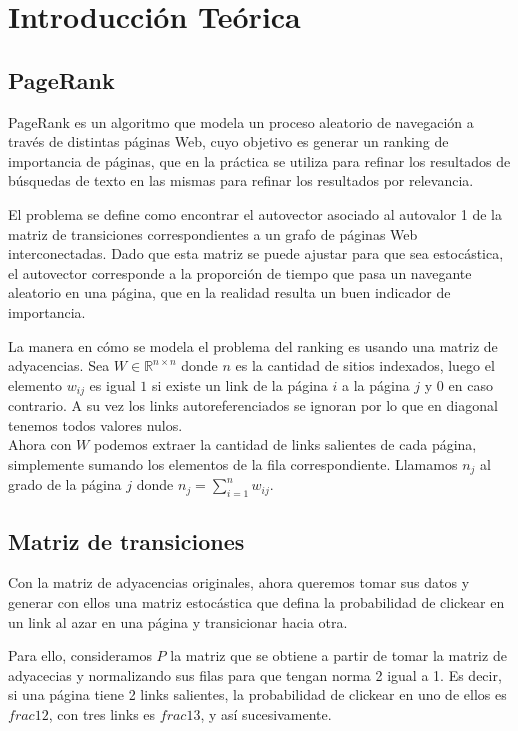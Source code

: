 \section{Introducción Teórica}

\subsection{PageRank}

PageRank es un algoritmo que modela un proceso aleatorio de navegación a través de 
distintas páginas Web, cuyo objetivo es generar un ranking de importancia de páginas,
que en la práctica se utiliza para refinar los resultados de búsquedas de texto en las mismas
para refinar los resultados por relevancia.

El problema se define como encontrar el autovector asociado al autovalor 1 de la matriz de transiciones
correspondientes a un grafo de páginas Web interconectadas. Dado que esta matriz se puede ajustar
para que sea estocástica, el autovector corresponde a la proporción de tiempo que pasa un navegante
aleatorio en una página, que en la realidad resulta un buen indicador de importancia.

La manera en cómo se modela el problema del ranking es usando una matriz de adyacencias.
Sea $W \in \mathbb{R}^{n \times n}$ donde $n$ es la cantidad de sitios indexados, luego el elemento
$w_{ij}$ es igual $1$ si existe un link de la página $i$ a la página $j$ y $0$ en caso
contrario. A su vez los links autoreferenciados se ignoran por lo que en diagonal tenemos todos valores nulos.\\

Ahora con $W$ podemos extraer la cantidad de links salientes de cada página,
simplemente sumando los elementos de la fila correspondiente. Llamamos $n_j$
al grado de la página $j$ donde $n_j = \sum^{n}_{i = 1} w_{ij}$.

\subsection{Matriz de transiciones}

Con la matriz de adyacencias originales, ahora queremos tomar sus datos y generar con ellos
una matriz estocástica que defina la probabilidad de clickear en un link al azar
en una página y transicionar hacia otra.

Para ello, consideramos $P$ la matriz que se obtiene a partir de tomar la matriz de
adyacecias y normalizando sus filas para que tengan norma 2 igual a 1. Es decir,
si una página tiene 2 links salientes, la probabilidad de clickear en uno de ellos
es $frac{1}{2}$, con tres links es $frac{1}{3}$, y así sucesivamente.

